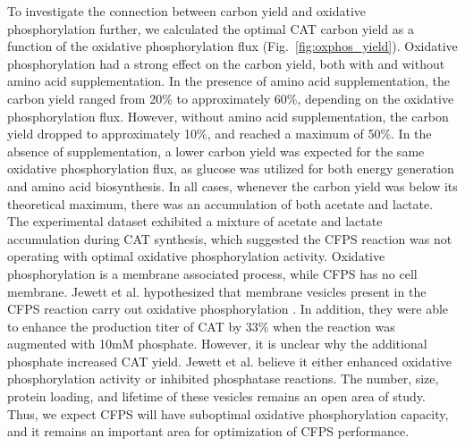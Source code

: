 \documentclass[journal=asbcd6,manuscript=article]{achemso}
\begin{document}

To investigate the connection between carbon yield and oxidative phosphorylation further, we calculated the optimal CAT carbon yield as a function of the oxidative phosphorylation flux (Fig.~\ref{fig:oxphos_yield}).
Oxidative phosphorylation had a strong effect on the carbon yield, both with and without amino acid supplementation.
In the presence of amino acid supplementation, the carbon yield ranged from 20\% to approximately 60\%, depending on the oxidative phosphorylation flux.
However, without amino acid supplementation, the carbon yield dropped to approximately 10\%, and reached a maximum of 50\%.
In the absence of supplementation, a lower carbon yield was expected for the same oxidative phosphorylation flux, as glucose was utilized for both energy generation and amino acid biosynthesis.
In all cases, whenever the carbon yield was below its theoretical maximum, there was an accumulation of both acetate and lactate.
The experimental dataset exhibited a mixture of acetate and lactate accumulation during CAT synthesis, which suggested the CFPS reaction was not operating with optimal oxidative phosphorylation activity.
Oxidative phosphorylation is a membrane associated process, while CFPS has no cell membrane.
Jewett et al. hypothesized that membrane vesicles present in the CFPS reaction carry out oxidative phosphorylation \cite{Jewett:2008aa}.
In addition, they were able to enhance the production titer of CAT by 33\% when the reaction was augmented with 10mM phosphate.
However, it is unclear why the additional phosphate increased CAT yield.
Jewett et al. believe it either enhanced oxidative phosphorylation activity or inhibited phosphatase reactions.
The number, size, protein loading, and lifetime of these vesicles remains an open area of study.
Thus, we expect CFPS will have suboptimal oxidative phosphorylation capacity, and it remains an important area for optimization of CFPS performance.

\end{document}
